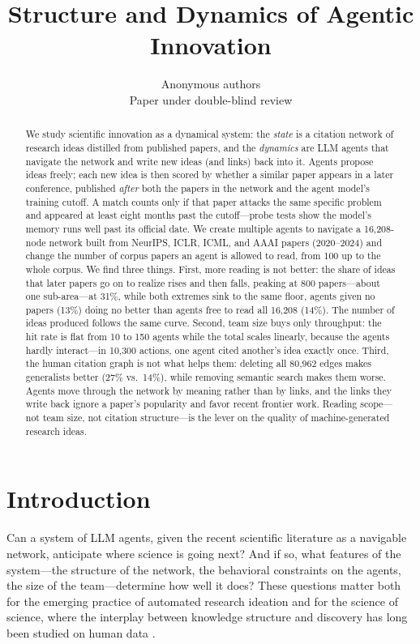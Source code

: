 \documentclass{article} %
\title{Structure and Dynamics of Agentic Innovation}
\author{Anonymous authors\\
Paper under double-blind review}
\begin{document}
\maketitle

\begin{abstract}
We study scientific innovation as a dynamical system: the \emph{state} is a
citation network of research ideas distilled from published papers, and the
\emph{dynamics} are LLM agents that navigate the network and write new ideas
(and links) back into it. Agents propose ideas freely; each new idea is then
scored by whether a similar paper appears in a later conference, published
\emph{after} both the papers in the network and the agent model's training
cutoff. A match counts only if that paper attacks the same specific problem
and appeared at least eight months past the cutoff---probe tests show the
model's memory runs well past its official date.
We create multiple agents to navigate a
16{,}208-node network built from NeurIPS, ICLR, ICML, and AAAI papers
(2020--2024) and change the number
of corpus papers an agent is allowed to read, from 100 up to the whole
corpus. We find three things. First, more reading is not better: the share of
ideas that later papers go on to realize rises and then falls, peaking at 800
papers---about one sub-area---at 31\%, while both extremes sink to the same
floor, agents given no papers (13\%) doing no better than agents free to read
all 16{,}208 (14\%). The number of ideas produced follows the same curve.
Second, team size buys only throughput: the hit rate is flat from 10 to 150
agents while the total scales linearly, because the agents hardly
interact---in 10{,}300 actions, one agent cited another's idea exactly once.
Third, the human citation graph is not what helps them: deleting all 80{,}962
edges makes generalists better (27\% vs.\ 14\%), while removing semantic
search makes them worse. Agents move through the network by meaning rather
than by links, and the links they write back ignore a paper's popularity and
favor recent frontier work. Reading scope---not team size, not citation
structure---is the lever on the quality of machine-generated research ideas.
\end{abstract}

\section{Introduction}

Can a system of LLM agents, given the recent scientific literature as a
navigable network, anticipate where science is going next? And if so, what
features of the system---the structure of the network, the behavioral
constraints on the agents, the size of the team---determine how well it
does? These questions matter both for the emerging practice of automated
research ideation \citep{lu2024aiscientist,si2024llmideas} and for the
science of science, where the interplay between knowledge structure and
discovery has long been studied on human data
\citep{fortunato2018science,uzzi2013atypical,wu2019teams}.
\end{document}
